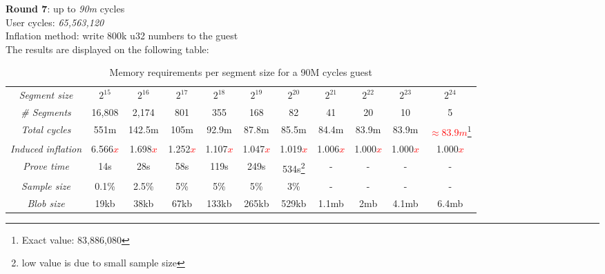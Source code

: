 \documentclass[a4paper, 10pt]{article}
\begin{document}
\par \noindent
\textbf{Round 7}: up to \textit{90m} cycles\\
User cycles: \textit{65,563,120}\\
Inflation method: write 800k u32 numbers to the guest\\
The results are displayed on the following table:
\begin{table}[H]
  	\begin{center}
    \label{tab:table8}
    \begin{minipage}{\textwidth}
    \begin{adjustbox}{width=\textwidth}
    \begin{tabular}{c|c|c|c|c|c|c|c|c|c|c}
	  \textit{Segment size} & $2^{15}$ & $2^{16}$ & $2^{17}$ & $2^{18}$ & $2^{19}$ & $2^{20}$ & $2^{21}$ & $2^{22}$ & $2^{23}$ & $2^{24}$\\
	  \textit{\# Segments} & 16,808 & 2,174 & 801 & 355 & 168 & 82 & 41 & 20 & 10 & 5\\
	  \textit{Total cycles} & 551m & 142.5m & 105m & 92.9m & 87.8m & 85.5m & 84.4m & 83.9m & 83.9m & \textcolor{red}{$\approx 83.9m$}\footnote{Exact value: 83,886,080}\\
	  \textit{Induced inflation} & 6.566\textcolor{red}{$x$} & 1.698\textcolor{red}{$x$} & 1.252\textcolor{red}{$x$} & 1.107\textcolor{red}{$x$} & 1.047\textcolor{red}{$x$} & 1.019\textcolor{red}{$x$} & 1.006\textcolor{red}{$x$} & 1.000\textcolor{red}{$x$} & 1.000\textcolor{red}{$x$} & 1.000\textcolor{red}{$x$}\\
	  \textit{Prove time} & 14s & 28s & 58s & 119s & 249s & 534s\footnote{low value is due to small sample size} & - & - & - & -\\
	  \textit{Sample size} & 0.1\% & 2.5\% & 5\% & 5\% & 5\% & 3\% & - & - & - & -\\
	  \textit{Blob size} & 19kb & 38kb & 67kb & 133kb & 265kb & 529kb & 1.1mb & 2mb & 4.1mb & 6.4mb\\
   	\end{tabular}
   	\end{adjustbox}
   	\end{minipage}
    \caption{Memory requirements per segment size for a 90M cycles guest}
  \end{center}
\end{table}
\end{document}
